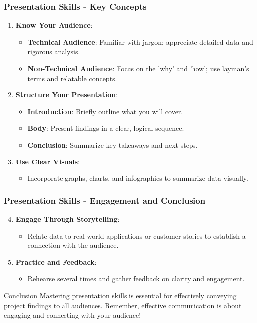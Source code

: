 \documentclass[aspectratio=169]{beamer}
\begin{document}
\begin{frame}[fragile]
    \frametitle{Presentation Skills - Key Concepts}
    \begin{enumerate}
        \item \textbf{Know Your Audience}:
            \begin{itemize}
                \item \textbf{Technical Audience}: Familiar with jargon; appreciate detailed data and rigorous analysis.
                \item \textbf{Non-Technical Audience}: Focus on the 'why' and 'how'; use layman’s terms and relatable concepts.
            \end{itemize}
        \item \textbf{Structure Your Presentation}:
            \begin{itemize}
                \item \textbf{Introduction}: Briefly outline what you will cover.
                \item \textbf{Body}: Present findings in a clear, logical sequence.
                \item \textbf{Conclusion}: Summarize key takeaways and next steps.
            \end{itemize}
        \item \textbf{Use Clear Visuals}:
            \begin{itemize}
                \item Incorporate graphs, charts, and infographics to summarize data visually.
            \end{itemize}
    \end{enumerate}
\end{frame}

\begin{frame}[fragile]
    \frametitle{Presentation Skills - Engagement and Conclusion}
    \begin{enumerate}
        \setcounter{enumi}{3} %
        \item \textbf{Engage Through Storytelling}:
            \begin{itemize}
                \item Relate data to real-world applications or customer stories to establish a connection with the audience.
            \end{itemize}
        \item \textbf{Practice and Feedback}:
            \begin{itemize}
                \item Rehearse several times and gather feedback on clarity and engagement.
            \end{itemize}
    \end{enumerate}

    \begin{block}{Conclusion}
        Mastering presentation skills is essential for effectively conveying project findings to all audiences. Remember, effective communication is about engaging and connecting with your audience!
    \end{block}
\end{frame}
\end{document}
